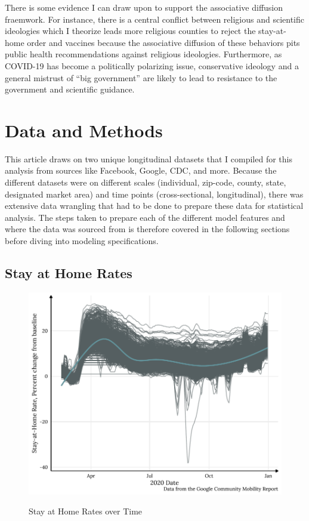 There is some evidence I can draw upon to support the associative diffusion
fraemwork. For instance, there is a central conflict between religious and
scientific ideologies which I theorize leads more religious counties to reject
the stay-at-home order and vaccines \citep{evansReligionScienceEpistemological2008}
because the associative diffusion of these behaviors pits public health
recommendations against religious ideologies.
Furthermore, as COVID-19 has become a politically polarizing issue, conservative
ideology and a general mistrust of ``big government'' \citep{frank2007, gauchat2008} are likely to lead to resistance to the
government and scientific guidance.

\hypertarget{data-and-methods}{%
\section{Data and Methods}\label{data-and-methods}}

This article draws on two unique longitudinal datasets that I compiled for this
analysis from sources like Facebook, Google, CDC, and more. Because the
different datasets were on different scales (individual, zip-code, county,
state, designated market area) and time points (cross-sectional, longitudinal),
there was extensive data wrangling that had to be done to prepare these data for
statistical analysis. The steps taken to prepare each of the different model
features and where the data was sourced from is therefore covered in the
following sections before diving into modeling specifications.

\hypertarget{stay-at-home-rates}{%
\subsection{Stay at Home Rates}\label{stay-at-home-rates}}



\begin{figure}
{\centering \includegraphics[width=0.8\linewidth]{figs/paper3/plot-google-1}}
\caption{Stay at Home Rates over Time}\label{fig:plot-google}
\end{figure}

